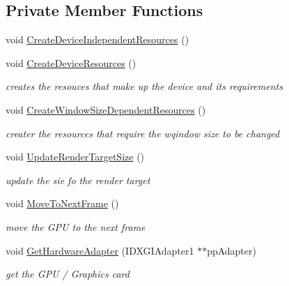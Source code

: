 \subsection*{Private Member Functions}
\begin{DoxyCompactItemize}
\item 
void \mbox{\hyperlink{class_d_x_1_1_device_resources_a35d9d8e993551e6d5dd0ed2b7bc25806}{Create\+Device\+Independent\+Resources}} ()
\item 
void \mbox{\hyperlink{class_d_x_1_1_device_resources_abfbb8815f68e3b3f7d065c3679fbe58f}{Create\+Device\+Resources}} ()
\begin{DoxyCompactList}\small\item\em creates the resouces that make up the device and its requirements \end{DoxyCompactList}\item 
void \mbox{\hyperlink{class_d_x_1_1_device_resources_a9556306971d5484caaa5a2aac42f253e}{Create\+Window\+Size\+Dependent\+Resources}} ()
\begin{DoxyCompactList}\small\item\em creater the resources that require the wqindow size to be changed \end{DoxyCompactList}\item 
void \mbox{\hyperlink{class_d_x_1_1_device_resources_a7adaa47153e97fbbcc524013905635f0}{Update\+Render\+Target\+Size}} ()
\begin{DoxyCompactList}\small\item\em update the sie fo the render target \end{DoxyCompactList}\item 
void \mbox{\hyperlink{class_d_x_1_1_device_resources_af7005ac5c0fb7c7582740d0a767398c6}{Move\+To\+Next\+Frame}} ()
\begin{DoxyCompactList}\small\item\em move the G\+PU to the next frame \end{DoxyCompactList}\item 
void \mbox{\hyperlink{class_d_x_1_1_device_resources_a9d990146724d7f465b277c95675459bd}{Get\+Hardware\+Adapter}} (I\+D\+X\+G\+I\+Adapter1 $\ast$$\ast$pp\+Adapter)
\begin{DoxyCompactList}\small\item\em get the G\+PU / Graphics card \end{DoxyCompactList}\end{DoxyCompactItemize}

